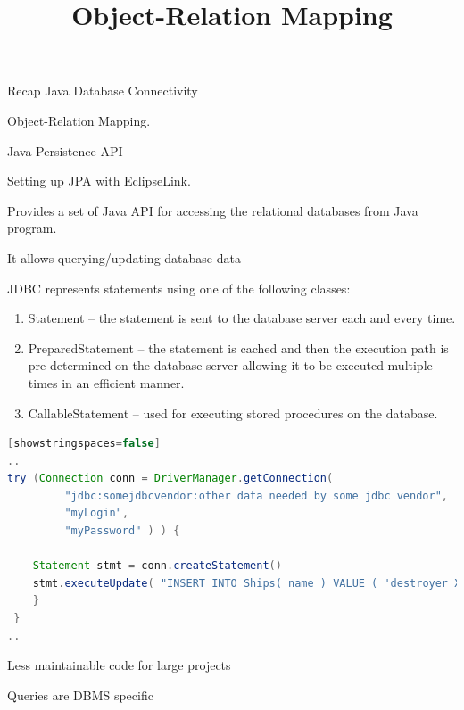\documentclass{beamer}
\title{Object-Relation Mapping}
\author{ }
\institute{Hogeschool Rotterdam \\ 
Rotterdam, Netherlands}
\date{}
\begin{document}
\maketitle

\begin{slide}{
\item Recap Java Database Connectivity  
\item Object-Relation Mapping.
\item Java Persistence API
\item Setting up JPA with EclipseLink.
}\end{slide}



\begin{slide}{
\item Provides a set of Java API for accessing the relational databases from Java program.
\item It allows querying/updating database data 
\item JDBC represents statements using one of the following classes:
\begin{enumerate}
	\pause
	 \item Statement – the statement is sent to the database server each and every time.
	 \pause
	 \item PreparedStatement – the statement is cached and then the execution path is pre-determined on the database server allowing it to be executed multiple times in an efficient manner.
	 \pause
	 \item CallableStatement – used for executing stored procedures on the database.
\end{enumerate}
}
\end{slide}



{
\begin{lstlisting}[language=java][showstringspaces=false]
..
try (Connection conn = DriverManager.getConnection(
	     "jdbc:somejdbcvendor:other data needed by some jdbc vendor",
	     "myLogin",
	     "myPassword" ) ) {
		
	Statement stmt = conn.createStatement()
	stmt.executeUpdate( "INSERT INTO Ships( name ) VALUE ( 'destroyer XYZ' ) " );
	}
 }  
..	
\end{lstlisting}	
}


\begin{slide}{
\item Less maintainable code for large projects
\item Queries are DBMS specific
}
\end{slide}
\end{document}
